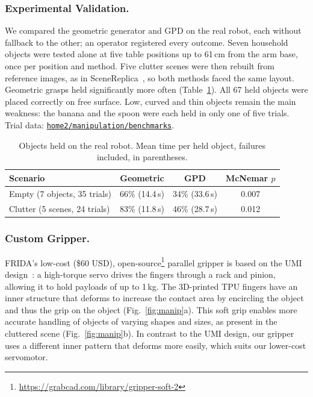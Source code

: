 \subsubsection{Experimental Validation.}
We compared the geometric generator and GPD on the real robot, each without fallback to the other; an operator registered every outcome. Seven household objects were tested alone at five table positions up to 61\,cm from the arm base, once per position and method. Five clutter scenes were then rebuilt from reference images, as in SceneReplica~\cite{khargonkar2024scenereplica}, so both methods faced the same layout. Geometric grasps held significantly more often (Table~\ref{tab:manipulation_results}). All 67 held objects were placed correctly on free surface. Low, curved and thin objects remain the main weakness: the banana and the spoon were each held in only one of five trials. Trial data: \href{https://github.com/RoBorregos/home2/tree/main/manipulation/benchmarks/2026-11}{\texttt{home2/manipulation/benchmarks}}.

\begin{table}[h]
\centering
\caption{Objects held on the real robot. Mean time per held object, failures included, in parentheses.}
\label{tab:manipulation_results}
\begin{tabular*}{\textwidth}{@{\extracolsep{\fill}}lccc}
\toprule
\textbf{Scenario} & \textbf{Geometric} & \textbf{GPD} & \textbf{McNemar $p$} \\
\midrule
Empty (7 objects, 35 trials)  & 66\% (14.4\,s) & 34\% (33.6\,s) & 0.007 \\
Clutter (5 scenes, 24 trials) & 83\% (11.8\,s) & 46\% (28.7\,s) & 0.012 \\
\bottomrule
\end{tabular*}
\end{table}

\subsubsection{Custom Gripper.}
FRIDA's low-cost (\$60 USD), open-source\footnote{\url{https://grabcad.com/library/gripper-soft-2}} parallel gripper is based on the UMI design~\cite{chi2024universal}: a high-torque servo drives the fingers through a rack and pinion, allowing it to hold payloads of up to 1\,kg. The 3D-printed TPU fingers have an inner structure that deforms to increase the contact area by encircling the object and thus the grip on the object (Fig.~\ref{fig:manip}a). This soft grip enables more accurate handling of objects of varying shapes and sizes, as present in the cluttered scene (Fig.~\ref{fig:manip}b). In contrast to the UMI design, our gripper uses a different inner pattern that deforms more easily, which suits our lower-cost servomotor.

